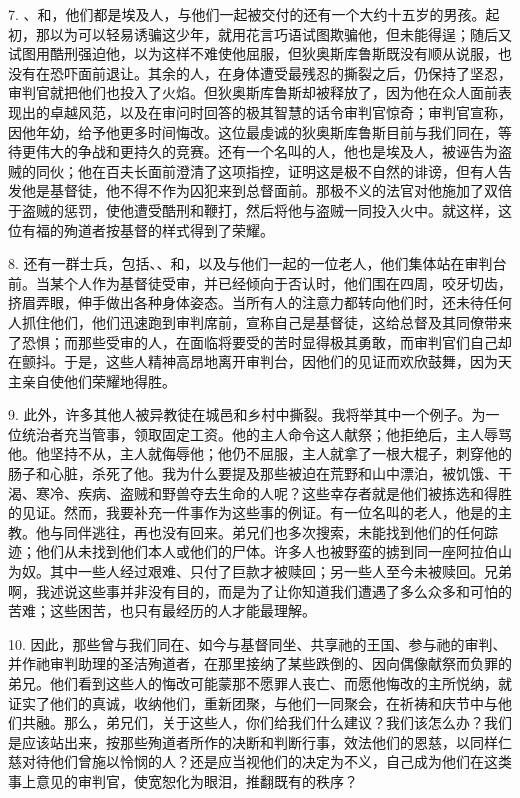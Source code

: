 7. 、和，他们都是埃及人，与他们一起被交付的还有一个大约十五岁的男孩。起初，那以为可以轻易诱骗这少年，就用花言巧语试图欺骗他，但未能得逞；随后又试图用酷刑强迫他，以为这样不难使他屈服，但狄奥斯库鲁斯既没有顺从说服，也没有在恐吓面前退让。其余的人，在身体遭受最残忍的撕裂之后，仍保持了坚忍，审判官就把他们也投入了火焰。但狄奥斯库鲁斯却被释放了，因为他在众人面前表现出的卓越风范，以及在审问时回答的极其智慧的话令审判官惊奇；审判官宣称，因他年幼，给予他更多时间悔改。这位最虔诚的狄奥斯库鲁斯目前与我们同在，等待更伟大的争战和更持久的竞赛。还有一个名叫的人，他也是埃及人，被诬告为盗贼的同伙；他在百夫长面前澄清了这项指控，证明这是极不自然的诽谤，但有人告发他是基督徒，他不得不作为囚犯来到总督面前。那极不义的法官对他施加了双倍于盗贼的惩罚，使他遭受酷刑和鞭打，然后将他与盗贼一同投入火中。就这样，这位有福的殉道者按基督的样式得到了荣耀。\par

8. 还有一群士兵，包括、、和，以及与他们一起的一位老人，他们集体站在审判台前。当某个人作为基督徒受审，并已经倾向于否认时，他们围在四周，咬牙切齿，挤眉弄眼，伸手做出各种身体姿态。当所有人的注意力都转向他们时，还未待任何人抓住他们，他们迅速跑到审判席前，宣称自己是基督徒，这给总督及其同僚带来了恐惧；而那些受审的人，在面临将要受的苦时显得极其勇敢，而审判官们自己却在颤抖。于是，这些人精神高昂地离开审判台，因他们的见证而欢欣鼓舞，因为天主亲自使他们荣耀地得胜。\par

9. 此外，许多其他人被异教徒在城邑和乡村中撕裂。我将举其中一个例子。为一位统治者充当管事，领取固定工资。他的主人命令这人献祭；他拒绝后，主人辱骂他。他坚持不从，主人就侮辱他；他仍不屈服，主人就拿了一根大棍子，刺穿他的肠子和心脏，杀死了他。我为什么要提及那些被迫在荒野和山中漂泊，被饥饿、干渴、寒冷、疾病、盗贼和野兽夺去生命的人呢？这些幸存者就是他们被拣选和得胜的见证。然而，我要补充一件事作为这些事的例证。有一位名叫的老人，他是的主教。他与同伴逃往，再也没有回来。弟兄们也多次搜索，未能找到他们的任何踪迹；他们从未找到他们本人或他们的尸体。许多人也被野蛮的掳到同一座阿拉伯山为奴。其中一些人经过艰难、只付了巨款才被赎回；另一些人至今未被赎回。兄弟啊，我述说这些事并非没有目的，而是为了让你知道我们遭遇了多么众多和可怕的苦难；这些困苦，也只有最经历的人才能最理解。\par

10. 因此，那些曾与我们同在、如今与基督同坐、共享祂的王国、参与祂的审判、并作祂审判助理的圣洁殉道者，在那里接纳了某些跌倒的、因向偶像献祭而负罪的弟兄。他们看到这些人的悔改可能蒙那不愿罪人丧亡、而愿他悔改的主所悦纳，就证实了他们的真诚，收纳他们，重新团聚，与他们一同聚会，在祈祷和庆节中与他们共融。那么，弟兄们，关于这些人，你们给我们什么建议？我们该怎么办？我们是应该站出来，按那些殉道者所作的决断和判断行事，效法他们的恩慈，以同样仁慈对待他们曾施以怜悯的人？还是应当视他们的决定为不义，自己成为他们在这类事上意见的审判官，使宽恕化为眼泪，推翻既有的秩序？\par

